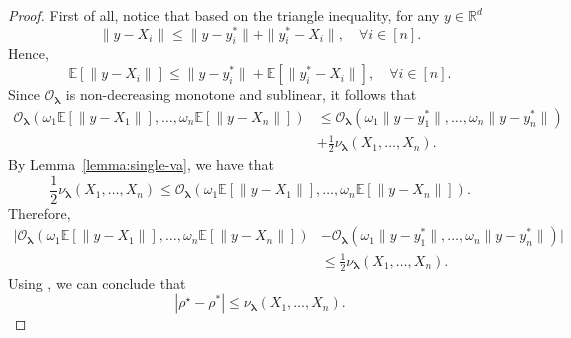 \documentclass[letter,11pt, reqno]{amsart}
\newcommand{\R}{\mathbb{R}}
\newcommand{\E}{\mathbb{E}}
\renewcommand{\O}{\mathcal{O}}
\renewcommand{\;}{\quad}
\theoremstyle{thmstyleone}%
\theoremstyle{thmstyletwo}%
\theoremstyle{thmstylethree}%
\begin{document}
\begin{proof}
First of all, notice that based on the triangle inequality, for any $y\in \R^d$
\begin{equation*}
    \|y-X_i\|\leq \|y-y^*_i\|+\|y^*_i-X_i\|, \; \forall i\in [n].
\end{equation*}
Hence,
\begin{equation*}
    \E\left[\|y-X_i\|\right]\leq \|y-y^*_i\|+ \E\left[\|y^*_i-X_i\|\right], \; \forall i\in [n].
\end{equation*}
Since $\O_{\bm \lambda}$ is non-decreasing monotone and sublinear, it follows that
\begin{align*}
    \O_{\bm \lambda}\left(\omega_1\E\left[\|y-X_1\|\right],\ldots,\omega_n\E\left[\|y-X_n\|\right]\right)&\leq \O_{\bm \lambda}\left(\omega_1\|y-y^*_1\|,\ldots,\omega_n\|y-y^*_n\|\right)\\ &+\frac{1}{2}\nu_{\bm{\lambda}}(X_1, \ldots,X_n).
\end{align*}
By Lemma~\ref{lemma:single-va}, we have that
\begin{equation*}
    \frac{1}{2}\nu_{\bm{\lambda}}(X_1, \ldots,X_n)\leq \O_{\bm \lambda}\left(\omega_1\E\left[\|y-X_1\|\right],\ldots,\omega_n\E\left[\|y-X_n\|\right]\right).
\end{equation*}
 Therefore, 
 \begin{align*}
     |\O_{\bm \lambda}\left(\omega_1\E\left[\|y-X_1\|\right],\ldots,\omega_n\E\left[\|y-X_n\|\right]\right)&-\O_{\bm \lambda}\left(\omega_1\|y-y^*_1\|,\ldots,\omega_n\|y-y^*_n\|\right)| \\ &\leq \frac{1}{2}\nu_{\bm{\lambda}}(X_1, \ldots,X_n).
 \end{align*}
 Using \cite[Th. 5]{geoffrion1977objective}, we can conclude that
 \begin{equation*}
     |\rho^\star-\rho^*|\leq \nu_{\bm{\lambda}}(X_1, \ldots,X_n).
 \end{equation*}
\end{proof}
\end{document}
